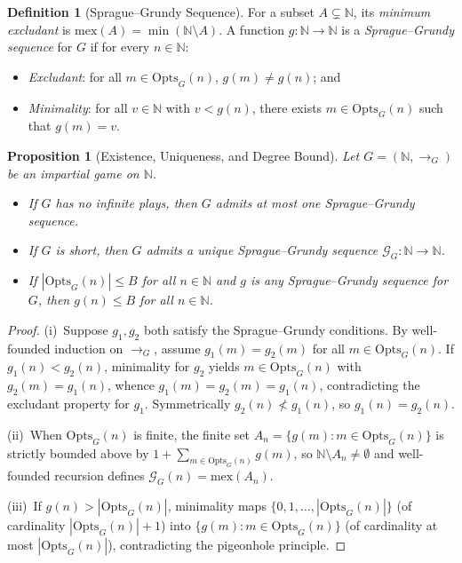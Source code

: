 \documentclass[11pt]{article}
\newtheorem{proposition}[theorem]{Proposition}
\theoremstyle{definition}
\newtheorem{definition}[theorem]{Definition}
\theoremstyle{remark}
\newcommand{\N}{\mathbb{N}}
\newcommand{\G}{\mathcal{G}}
\newcommand{\mex}{\mathrm{mex}}
\newcommand{\Opts}{\mathrm{Opts}}
\begin{document}
\begin{definition}[Sprague--Grundy Sequence]
For a subset $A \subsetneq \N$, its \emph{minimum excludant} is $\mex(A) = \min(\N \setminus A)$. A function $g : \N \to \N$ is a \emph{Sprague--Grundy sequence} for $G$ if for every $n \in \N$:
\begin{itemize}
  \item[(a)] \emph{Excludant}: for all $m \in \Opts_G(n)$, $g(m) \neq g(n)$; and
  \item[(b)] \emph{Minimality}: for all $v \in \N$ with $v < g(n)$, there exists $m \in \Opts_G(n)$ such that $g(m) = v$.
\end{itemize}
\end{definition}

\begin{proposition}[Existence, Uniqueness, and Degree Bound]
\label{prop:sg-basic}
Let $G = (\N, \to_G)$ be an impartial game on $\N$.
\begin{itemize}
  \item[\textup{(i)}] If $G$ has no infinite plays, then $G$ admits at most one Sprague--Grundy sequence.
  \item[\textup{(ii)}] If $G$ is short, then $G$ admits a unique Sprague--Grundy sequence $\G_G : \N \to \N$.
  \item[\textup{(iii)}] If $|\Opts_G(n)| \le B$ for all $n \in \N$ and $g$ is any Sprague--Grundy sequence for $G$, then $g(n) \le B$ for all $n \in \N$.
\end{itemize}
\end{proposition}
\begin{proof}
(i)~Suppose $g_1, g_2$ both satisfy the Sprague--Grundy conditions. By well-founded induction on $\to_G$, assume $g_1(m) = g_2(m)$ for all $m \in \Opts_G(n)$. If $g_1(n) < g_2(n)$, minimality for $g_2$ yields $m \in \Opts_G(n)$ with $g_2(m) = g_1(n)$, whence $g_1(m) = g_2(m) = g_1(n)$, contradicting the excludant property for $g_1$. Symmetrically $g_2(n) \not< g_1(n)$, so $g_1(n) = g_2(n)$.

(ii)~When $\Opts_G(n)$ is finite, the finite set $A_n = \{g(m) : m \in \Opts_G(n)\}$ is strictly bounded above by $1 + \sum_{m \in \Opts_G(n)} g(m)$, so $\N \setminus A_n \neq \emptyset$ and well-founded recursion defines $\G_G(n) = \mex(A_n)$.

(iii)~If $g(n) > |\Opts_G(n)|$, minimality maps $\{0,1,\dots,|\Opts_G(n)|\}$ (of cardinality $|\Opts_G(n)|+1$) into $\{g(m) : m \in \Opts_G(n)\}$ (of cardinality at most $|\Opts_G(n)|$), contradicting the pigeonhole principle.
\end{proof}
\end{document}
